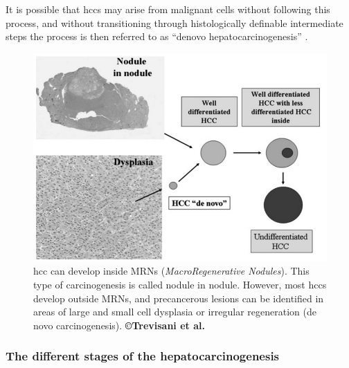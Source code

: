 It is possible that \ac{hcc}s may arise from malignant cells without
following this process, and without transitioning through histologically
definable intermediate steps the process is then referred to as ``denovo
hepatocarcinogenesis'' \cite{Taguchi2002}.


\begin{figure}[th!]
\centering
\includegraphics[width=0.7\linewidth]{images/image3}
\caption{\ac{hcc} can develop inside MRNs (\emph{MacroRegenerative Nodules}). This type of carcinogenesis is called nodule in nodule. However, most \ac{hcc}s develop outside MRNs, and precancerous lesions can be identified in areas of large and small cell dysplasia or irregular regeneration (de novo carcinogenesis). \textbf{©Trevisani et al. \cite{Trevisani2008a}}}
\label{Trevisani2008_Fig2}
\end{figure}

\subsubsection{The different stages of the hepatocarcinogenesis}

